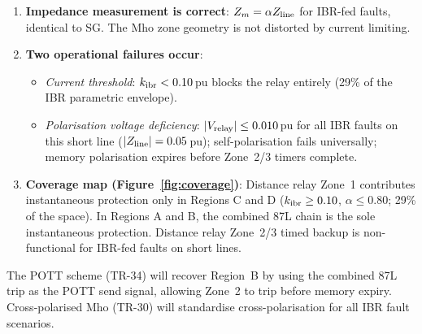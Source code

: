 \documentclass[11pt,a4paper]{article}
\begin{document}
\begin{enumerate}
  \item \textbf{Impedance measurement is correct}: $Z_m = \alpha Z_{\rm line}$
    for IBR-fed faults, identical to SG.  The Mho zone geometry is not
    distorted by current limiting.

  \item \textbf{Two operational failures occur}:
    \begin{itemize}
      \item \emph{Current threshold}: $k_{\rm ibr} < 0.10$\,pu blocks
        the relay entirely (29\% of the IBR parametric envelope).
      \item \emph{Polarisation voltage deficiency}: $|V_{\rm relay}|
        \leq 0.010$\,pu for all IBR faults on this short line
        ($|Z_{\rm line}| = 0.05$\,pu); self-polarisation fails universally;
        memory polarisation expires before Zone~2/3 timers complete.
    \end{itemize}

  \item \textbf{Coverage map (Figure~\ref{fig:coverage})}: Distance relay
    Zone~1 contributes instantaneous protection only in Regions C and D
    ($k_{\rm ibr} \geq 0.10$, $\alpha \leq 0.80$; 29\% of the space).
    In Regions A and B, the combined 87L chain is the sole instantaneous
    protection.  Distance relay Zone~2/3 timed backup is non-functional
    for IBR-fed faults on short lines.
\end{enumerate}

The POTT scheme (TR-34) will recover Region~B by using the combined 87L
trip as the POTT send signal, allowing Zone~2 to trip before memory
expiry.  Cross-polarised Mho (TR-30) will standardise cross-polarisation
for all IBR fault scenarios.



\end{document}

